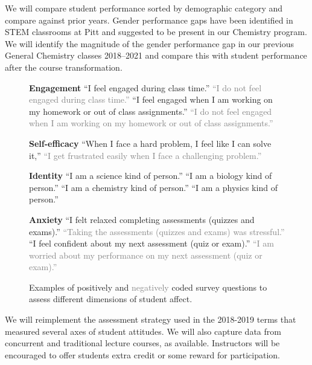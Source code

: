 \documentclass[10pt,letterpaper]{article}
\begin{document}
 We will compare student performance sorted by demographic category and compare against prior years. Gender performance gaps have been identified in STEM classrooms at Pitt and suggested to be present in our Chemistry program. We will identify the magnitude of the gender performance gap in our previous General Chemistry classes 2018--2021 and compare this with student performance after the course transformation.

\begin{figure}
\begin{minipage}{7.5cm}
\footnotesize\sffamily
\textbf{Engagement} 
``I feel engaged during class time.'' 
\textcolor{gray}{``I do not feel engaged during class time.''} 
``I feel engaged when I am working on my homework or out of class assignments.'' 
\textcolor{gray}{``I do not feel engaged when I am working on my homework or out of class assignments.''}


\textbf{Self-efficacy}
``When I face a hard problem, I feel like I can solve it,'' 
\textcolor{gray}{``I get frustrated easily when I face a challenging problem.''}

\textbf{Identity}
``I am a science kind of person.'' ``I am a biology kind of person.'' ``I am a chemistry kind of person.'' ``I am a physics kind of person.'' 

\textbf{Anxiety}
``I felt relaxed completing assessments (quizzes and exams).'' 
\textcolor{gray}{``Taking the assessments (quizzes and exams) was stressful.'' }
``I feel confident about my next assessment (quiz or exam).''
\textcolor{gray}{``I am worried about my performance on my next assessment (quiz or exam).'' }
\end{minipage}
\caption{Examples of positively and \textcolor{gray}{negatively} coded survey questions to assess different dimensions of student affect.}\label{fig:attitudes}
\end{figure}

We will reimplement the assessment strategy used in the 2018-2019 terms that measured several axes of student attitudes. 
We will also capture data from concurrent \pogil and traditional lecture courses, as available. Instructors will be encouraged to offer students extra credit or some reward for participation.
\end{document}
